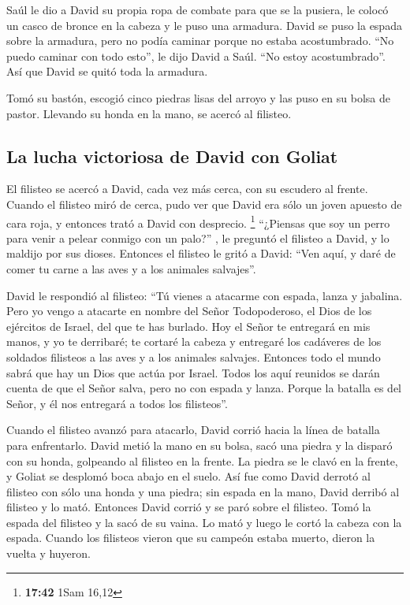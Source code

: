  Saúl le dio a David su propia ropa de combate para que
se la pusiera, le colocó un casco de bronce en la cabeza y le puso una
armadura.  David se puso la espada sobre la armadura,
pero no podía caminar porque no estaba acostumbrado. ``No puedo caminar
con todo esto'', le dijo David a Saúl. ``No estoy acostumbrado''. Así
que David se quitó toda la armadura.

 Tomó su bastón, escogió cinco piedras lisas del arroyo y
las puso en su bolsa de pastor. Llevando su honda en la mano, se acercó
al filisteo.

\hypertarget{la-lucha-victoriosa-de-david-con-goliat}{%
\subsection{La lucha victoriosa de David con
Goliat}\label{la-lucha-victoriosa-de-david-con-goliat}}

 El filisteo se acercó a David, cada vez más cerca, con
su escudero al frente.  Cuando el filisteo miró de cerca,
pudo ver que David era sólo un joven apuesto de cara roja, y entonces
trató a David con desprecio. \footnote{\textbf{17:42} 1Sam 16,12}
 ``¿Piensas que soy un perro para venir a pelear conmigo
con un palo?'' , le preguntó el filisteo a David, y lo maldijo por sus
dioses.  Entonces el filisteo le gritó a David: ``Ven
aquí, y daré de comer tu carne a las aves y a los animales salvajes''.

 David le respondió al filisteo: ``Tú vienes a atacarme
con espada, lanza y jabalina. Pero yo vengo a atacarte en nombre del
Señor Todopoderoso, el Dios de los ejércitos de Israel, del que te has
burlado.  Hoy el Señor te entregará en mis manos, y yo te
derribaré; te cortaré la cabeza y entregaré los cadáveres de los
soldados filisteos a las aves y a los animales salvajes. Entonces todo
el mundo sabrá que hay un Dios que actúa por Israel. 
Todos los aquí reunidos se darán cuenta de que el Señor salva, pero no
con espada y lanza. Porque la batalla es del Señor, y él nos entregará a
todos los filisteos''.

 Cuando el filisteo avanzó para atacarlo, David corrió
hacia la línea de batalla para enfrentarlo.  David metió
la mano en su bolsa, sacó una piedra y la disparó con su honda,
golpeando al filisteo en la frente. La piedra se le clavó en la frente,
y Goliat se desplomó boca abajo en el suelo.  Así fue
como David derrotó al filisteo con sólo una honda y una piedra; sin
espada en la mano, David derribó al filisteo y lo mató. 
Entonces David corrió y se paró sobre el filisteo. Tomó la espada del
filisteo y la sacó de su vaina. Lo mató y luego le cortó la cabeza con
la espada. Cuando los filisteos vieron que su campeón estaba muerto,
dieron la vuelta y huyeron.

